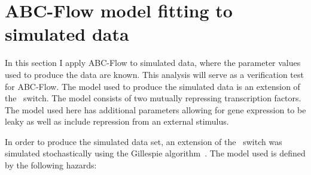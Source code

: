 %
%
\clearpage
\section{ABC-Flow model fitting to simulated data }



In this section I apply ABC-Flow to simulated data, where the parameter values used to produce the data are known. This analysis will serve as a verification test for ABC-Flow. The model used to produce the simulated data is an extension of the~\textcite{Gardner:2000vha} switch. The model consists of two mutually repressing transcription factors. The model used here has additional parameters allowing for gene expression to be leaky as well as include repression from an external stimulus.

In order to produce the simulated data set, an extension of the~\textcite{Gardner:2000vha} switch was simulated stochastically using the Gillespie algorithm~\autocite{Gillespie:1977ww}. The model used is defined by the following hazards:

